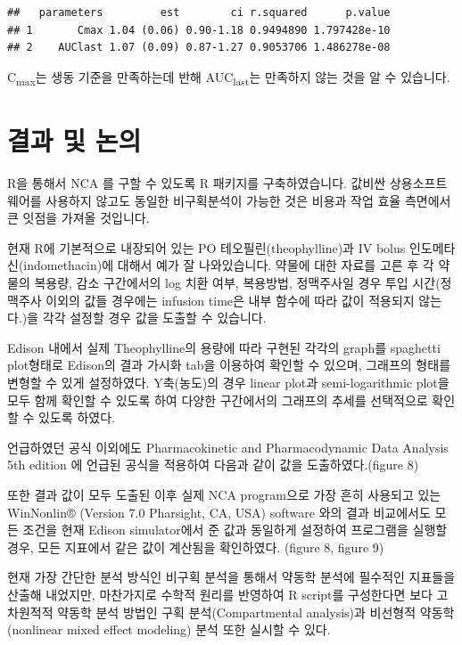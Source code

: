 \documentclass[12pt,]{krantz}
\theoremstyle{definition}
\theoremstyle{definition}
\theoremstyle{definition}
\theoremstyle{remark}
\begin{document}
\begin{verbatim}
##   parameters         est        ci r.squared      p.value
## 1       Cmax 1.04 (0.06) 0.90-1.18 0.9494890 1.797428e-10
## 2    AUClast 1.07 (0.09) 0.87-1.27 0.9053706 1.486278e-08
\end{verbatim}

C\textsubscript{max}는 생동 기준을 만족하는데 반해
AUC\textsubscript{last}는 만족하지 않는 것을 알 수 있습니다.

\chapter{결과 및 논의}\label{result}

R을 통해서 NCA 를 구할 수 있도록 R 패키지를 구축하였습니다. 값비싼
상용소프트웨어를 사용하지 않고도 동일한 비구획분석이 가능한 것은 비용과
작업 효율 측면에서 큰 잇점을 가져올 것입니다.

현재 R에 기본적으로 내장되어 있는 PO 테오필린(theophylline)과 IV bolus
인도메타신(indomethacin)에 대해서 예가 잘 나와있습니다. 약물에 대한
자료를 고른 후 각 약물의 복용량, 감소 구간에서의 log 치환 여부,
복용방법, 정맥주사일 경우 투입 시간(정맥주사 이외의 값들 경우에는
infusion time은 내부 함수에 따라 값이 적용되지 않는다.)을 각각 설정할
경우 값을 도출할 수 있습니다.

Edison 내에서 실제 Theophylline의 용량에 따라 구현된 각각의 graph를
spaghetti plot형태로 Edison의 결과 가시화 tab을 이용하여 확인할 수
있으며, 그래프의 형태를 변형할 수 있게 설정하였다. Y축(농도)의 경우
linear plot과 semi-logarithmic plot을 모두 함께 확인할 수 있도록 하여
다양한 구간에서의 그래프의 추세를 선택적으로 확인할 수 있도록 하였다.

언급하였던 공식 이외에도 Pharmacokinetic and Pharmacodynamic Data
Analysis 5th edition 에 언급된 공식을 적용하여 다음과 같이 값을
도출하였다.(figure 8)

또한 결과 값이 모두 도출된 이후 실제 NCA program으로 가장 흔히 사용되고
있는 WinNonlin® (Version 7.0 Pharsight, CA, USA) software 와의 결과
비교에서도 모든 조건을 현재 Edison simulator에서 준 값과 동일하게
설정하여 프로그램을 실행할 경우, 모든 지표에서 같은 값이 계산됨을
확인하였다. (figure 8, figure 9)

현재 가장 간단한 분석 방식인 비구획 분석을 통해서 약동학 분석에 필수적인
지표들을 산출해 내었지만, 마찬가지로 수학적 원리를 반영하여 R script를
구성한다면 보다 고차원적적 약동학 분석 방법인 구획 분석(Compartmental
analysis)과 비선형적 약동학(nonlinear mixed effect modeling) 분석 또한
실시할 수 있다.
\end{document}
